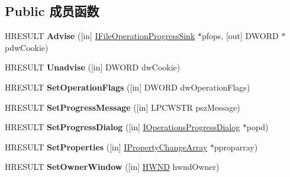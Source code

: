 \subsection*{Public 成员函数}
\begin{DoxyCompactItemize}
\item 
\mbox{\label{interface_i_file_operation_af0a1816733b22851153c26819c58e8b4}} 
H\+R\+E\+S\+U\+LT {\bfseries Advise} (\mbox{[}in\mbox{]} \hyperlink{interface_i_file_operation_progress_sink}{I\+File\+Operation\+Progress\+Sink} $\ast$pfops, \mbox{[}out\mbox{]} D\+W\+O\+RD $\ast$pdw\+Cookie)
\item 
\mbox{\label{interface_i_file_operation_a144ad76d4e614dde9637907375ed6f2b}} 
H\+R\+E\+S\+U\+LT {\bfseries Unadvise} (\mbox{[}in\mbox{]} D\+W\+O\+RD dw\+Cookie)
\item 
\mbox{\label{interface_i_file_operation_a28c8b1b1ce4155883a9330a2089bc7ba}} 
H\+R\+E\+S\+U\+LT {\bfseries Set\+Operation\+Flags} (\mbox{[}in\mbox{]} D\+W\+O\+RD dw\+Operation\+Flags)
\item 
\mbox{\label{interface_i_file_operation_afec6f6ae6a8835a90edea7a79f9ba265}} 
H\+R\+E\+S\+U\+LT {\bfseries Set\+Progress\+Message} (\mbox{[}in\mbox{]} L\+P\+C\+W\+S\+TR psz\+Message)
\item 
\mbox{\label{interface_i_file_operation_ad580a2a9a0979961a25919ff7075bbf4}} 
H\+R\+E\+S\+U\+LT {\bfseries Set\+Progress\+Dialog} (\mbox{[}in\mbox{]} \hyperlink{interface_i_operations_progress_dialog}{I\+Operations\+Progress\+Dialog} $\ast$popd)
\item 
\mbox{\label{interface_i_file_operation_a540b52308b31bf4b843d21bb5dcfaddf}} 
H\+R\+E\+S\+U\+LT {\bfseries Set\+Properties} (\mbox{[}in\mbox{]} \hyperlink{interface_i_property_change_array}{I\+Property\+Change\+Array} $\ast$pproparray)
\item 
\mbox{\label{interface_i_file_operation_a4d098a26e94f0dc736f48676cee3da1d}} 
H\+R\+E\+S\+U\+LT {\bfseries Set\+Owner\+Window} (\mbox{[}in\mbox{]} \hyperlink{interfacevoid}{H\+W\+ND} hwnd\+Owner)
\item 

\end{DoxyCompactItemize}
